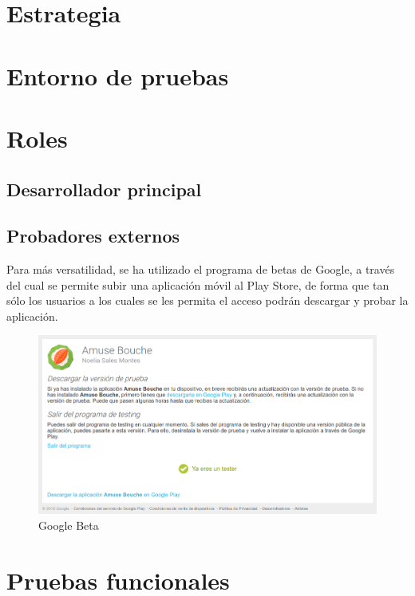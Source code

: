 

\section{Estrategia}

\section{Entorno de pruebas}

\section{Roles}

\subsection{Desarrollador principal}


\subsection{Probadores externos}

Para más versatilidad, se ha utilizado el programa de betas de Google, a través
del cual se permite subir una aplicación móvil al Play Store, de forma que tan
sólo los usuarios a los cuales se les permita el acceso podrán descargar y
probar la aplicación.

\begin{figure}[htbp]
  \centering
  \includegraphics[width=\textwidth]{cap7/img/google-beta}
  \caption{Google Beta}
  \label{fig:google-beta}
\end{figure}


\section{Pruebas funcionales}

